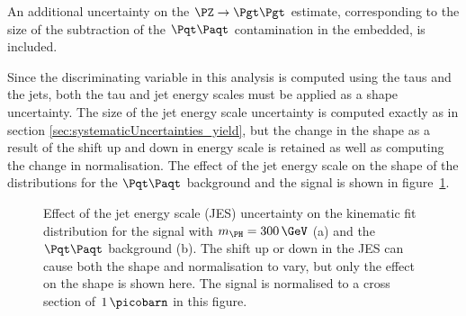 An additional uncertainty on the $\ZToTauTau$ estimate, corresponding to the
size of the subtraction of the $\ttbar$ contamination in the embedded, is
included. 

Since the discriminating variable in this analysis is computed using the taus
and the jets, both the tau and jet energy scales must be applied as a shape
uncertainty. The size of the jet energy scale uncertainty is computed exactly as
in section \ref{sec:systematicUncertainties_yield}, but the change in the shape
as a result of the shift up and down in energy scale is retained as well as 
computing the change in normalisation. The effect of the jet energy scale
on the shape of the distributions for the $\ttbar$ background and the signal is
shown in figure~\ref{fig:kinfitjes}.

\begin{figure}
\begin{center}

\end{center}
\caption[Effect of the jet energy scale uncertainty on the kinematic fit distribution for
the signal with $m_{\PH}=300\,\GeV$ (a) and the $\ttbar$ background (b).]{
Effect of the jet energy scale (JES) uncertainty on the kinematic fit distribution for
the signal with $m_{\PH}=300\,\GeV$ (a) and the $\ttbar$ background (b).
The shift up or down in the JES can cause both the shape and normalisation to
vary, but only the effect on the shape is shown here. 
The signal is normalised to a cross section of $1\,\picobarn$ in this figure.}
\label{fig:kinfitjes}
\end{figure} 


